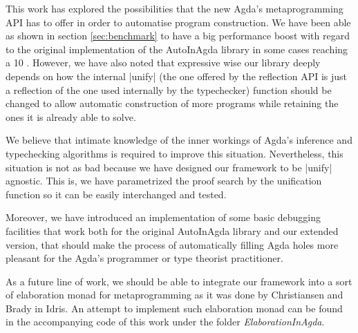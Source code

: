 \documentclass[a4paper]{article}
\begin{document}
This work has explored the possibilities that the new Agda's metaprogramming API
has to offer in order to automatise program construction. We have been able as
shown in section \ref{sec:benchmark} to have a big performance boost with
regard to the original implementation of the AutoInAgda library in some cases
reaching a 10 . However, we have also noted that
expressive wise our library deeply depends on how the internal |unify| (the one
offered by the reflection API is just a reflection of the one used internally
by the typechecker) function should be changed to allow automatic construction
of more programs while retaining the ones it is already able to solve.

We believe that intimate knowledge of the inner workings of Agda's inference and
typechecking algorithms is required to improve this situation. Nevertheless,
this situation is not as bad because we have designed our framework to be
|unify| agnostic. This is, we have parametrized the proof search by the
unification function so it can be easily interchanged and tested.

Moreover, we have introduced an implementation of some basic debugging
facilities that work both for the original AutoInAgda library and our extended
version, that should make the process of automatically filling Agda holes more
pleasant for the Agda's programmer or type theorist practitioner.

As a future line of work, we should be able to integrate our framework into a
sort of elaboration monad for metaprogramming as it was done by Christiansen and
Brady \cite{Christiansen:2016:ERE:2951913.2951932} in Idris. An attempt to
implement such elaboration monad can be found in the accompanying code of this
work under the folder \emph{ElaborationInAgda}.

\appendix



\end{document}
